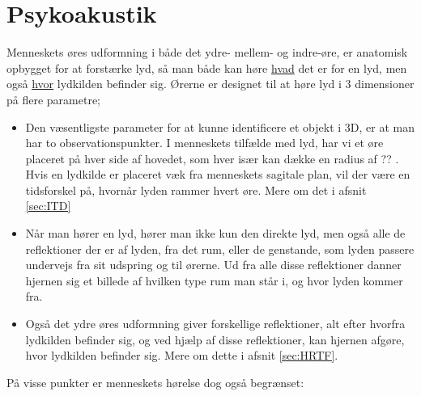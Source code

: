 \chapter{Psykoakustik}

Menneskets øres udformning i både det ydre- mellem- og indre-øre, er anatomisk opbygget for at forstærke lyd, så man både kan høre \underline{hvad} det er for en lyd, men også \underline{hvor} lydkilden befinder sig. Ørerne er designet til at høre lyd i 3 dimensioner på flere parametre;

\begin{itemize}
	\item  Den væsentligste parameter for at kunne identificere et objekt i 3D, er at man har to observationspunkter. I menneskets tilfælde med lyd, har vi et øre placeret på hver side af hovedet, som hver især kan dække en radius af ?? . Hvis en lydkilde er placeret væk fra menneskets sagitale plan, vil der være en tidsforskel på, hvornår lyden rammer hvert øre. Mere om det i afsnit \ref{sec:ITD}

\item  Når man hører en lyd, hører man ikke kun den direkte lyd, men også alle de reflektioner der er af lyden, fra det rum, eller de genstande, som lyden passere undervejs fra sit udspring og til ørerne. Ud fra alle disse reflektioner danner hjernen sig et billede af hvilken type rum man står i, og hvor lyden kommer fra. 

\item  Også det ydre øres udformning giver forskellige reflektioner, alt efter hvorfra lydkilden befinder sig, og ved hjælp af disse reflektioner, kan hjernen afgøre, hvor lydkilden befinder sig. Mere om dette i afsnit \ref{sec:HRTF}.


\end{itemize}

På visse punkter er menneskets hørelse dog også begrænset:

